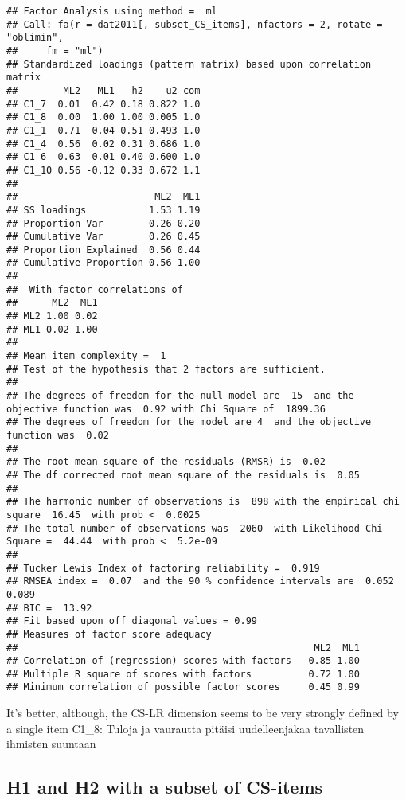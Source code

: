 \documentclass[
]{article}
\begin{document}
\begin{verbatim}
## Factor Analysis using method =  ml
## Call: fa(r = dat2011[, subset_CS_items], nfactors = 2, rotate = "oblimin", 
##     fm = "ml")
## Standardized loadings (pattern matrix) based upon correlation matrix
##        ML2   ML1   h2    u2 com
## C1_7  0.01  0.42 0.18 0.822 1.0
## C1_8  0.00  1.00 1.00 0.005 1.0
## C1_1  0.71  0.04 0.51 0.493 1.0
## C1_4  0.56  0.02 0.31 0.686 1.0
## C1_6  0.63  0.01 0.40 0.600 1.0
## C1_10 0.56 -0.12 0.33 0.672 1.1
## 
##                        ML2  ML1
## SS loadings           1.53 1.19
## Proportion Var        0.26 0.20
## Cumulative Var        0.26 0.45
## Proportion Explained  0.56 0.44
## Cumulative Proportion 0.56 1.00
## 
##  With factor correlations of 
##      ML2  ML1
## ML2 1.00 0.02
## ML1 0.02 1.00
## 
## Mean item complexity =  1
## Test of the hypothesis that 2 factors are sufficient.
## 
## The degrees of freedom for the null model are  15  and the objective function was  0.92 with Chi Square of  1899.36
## The degrees of freedom for the model are 4  and the objective function was  0.02 
## 
## The root mean square of the residuals (RMSR) is  0.02 
## The df corrected root mean square of the residuals is  0.05 
## 
## The harmonic number of observations is  898 with the empirical chi square  16.45  with prob <  0.0025 
## The total number of observations was  2060  with Likelihood Chi Square =  44.44  with prob <  5.2e-09 
## 
## Tucker Lewis Index of factoring reliability =  0.919
## RMSEA index =  0.07  and the 90 % confidence intervals are  0.052 0.089
## BIC =  13.92
## Fit based upon off diagonal values = 0.99
## Measures of factor score adequacy             
##                                                    ML2  ML1
## Correlation of (regression) scores with factors   0.85 1.00
## Multiple R square of scores with factors          0.72 1.00
## Minimum correlation of possible factor scores     0.45 0.99
\end{verbatim}

It's better, although, the CS-LR dimension seems to be very strongly
defined by a single item C1\_8: Tuloja ja vaurautta pitäisi
uudelleenjakaa tavallisten ihmisten suuntaan

\hypertarget{h1-and-h2-with-a-subset-of-cs-items}{%
\subsection{H1 and H2 with a subset of
CS-items}\label{h1-and-h2-with-a-subset-of-cs-items}}
\end{document}
